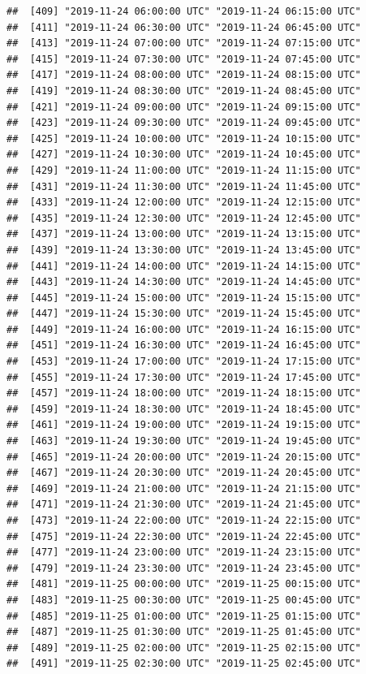 \documentclass{article}\usepackage[]{graphicx}\usepackage[]{color}
\makeatletter
\newenvironment{kframe}{%
 \def\at@end@of@kframe{}%
 \ifinner\ifhmode%
  \def\at@end@of@kframe{\end{minipage}}%
  \begin{minipage}{\columnwidth}%
 \fi\fi%
 \def\FrameCommand##1{\hskip\@totalleftmargin \hskip-\fboxsep
 \colorbox{shadecolor}{##1}\hskip-\fboxsep
     \hskip-\linewidth \hskip-\@totalleftmargin \hskip\columnwidth}%
 \MakeFramed {\advance\hsize-\width
   \@totalleftmargin\z@ \linewidth\hsize
   \@setminipage}}%
 {\par\unskip\endMakeFramed%
 \at@end@of@kframe}
\newenvironment{knitrout}{}{} %
\makeatother
\begin{document}
\begin{knitrout}
\begin{kframe}
\begin{verbatim}
##  [409] "2019-11-24 06:00:00 UTC" "2019-11-24 06:15:00 UTC"
##  [411] "2019-11-24 06:30:00 UTC" "2019-11-24 06:45:00 UTC"
##  [413] "2019-11-24 07:00:00 UTC" "2019-11-24 07:15:00 UTC"
##  [415] "2019-11-24 07:30:00 UTC" "2019-11-24 07:45:00 UTC"
##  [417] "2019-11-24 08:00:00 UTC" "2019-11-24 08:15:00 UTC"
##  [419] "2019-11-24 08:30:00 UTC" "2019-11-24 08:45:00 UTC"
##  [421] "2019-11-24 09:00:00 UTC" "2019-11-24 09:15:00 UTC"
##  [423] "2019-11-24 09:30:00 UTC" "2019-11-24 09:45:00 UTC"
##  [425] "2019-11-24 10:00:00 UTC" "2019-11-24 10:15:00 UTC"
##  [427] "2019-11-24 10:30:00 UTC" "2019-11-24 10:45:00 UTC"
##  [429] "2019-11-24 11:00:00 UTC" "2019-11-24 11:15:00 UTC"
##  [431] "2019-11-24 11:30:00 UTC" "2019-11-24 11:45:00 UTC"
##  [433] "2019-11-24 12:00:00 UTC" "2019-11-24 12:15:00 UTC"
##  [435] "2019-11-24 12:30:00 UTC" "2019-11-24 12:45:00 UTC"
##  [437] "2019-11-24 13:00:00 UTC" "2019-11-24 13:15:00 UTC"
##  [439] "2019-11-24 13:30:00 UTC" "2019-11-24 13:45:00 UTC"
##  [441] "2019-11-24 14:00:00 UTC" "2019-11-24 14:15:00 UTC"
##  [443] "2019-11-24 14:30:00 UTC" "2019-11-24 14:45:00 UTC"
##  [445] "2019-11-24 15:00:00 UTC" "2019-11-24 15:15:00 UTC"
##  [447] "2019-11-24 15:30:00 UTC" "2019-11-24 15:45:00 UTC"
##  [449] "2019-11-24 16:00:00 UTC" "2019-11-24 16:15:00 UTC"
##  [451] "2019-11-24 16:30:00 UTC" "2019-11-24 16:45:00 UTC"
##  [453] "2019-11-24 17:00:00 UTC" "2019-11-24 17:15:00 UTC"
##  [455] "2019-11-24 17:30:00 UTC" "2019-11-24 17:45:00 UTC"
##  [457] "2019-11-24 18:00:00 UTC" "2019-11-24 18:15:00 UTC"
##  [459] "2019-11-24 18:30:00 UTC" "2019-11-24 18:45:00 UTC"
##  [461] "2019-11-24 19:00:00 UTC" "2019-11-24 19:15:00 UTC"
##  [463] "2019-11-24 19:30:00 UTC" "2019-11-24 19:45:00 UTC"
##  [465] "2019-11-24 20:00:00 UTC" "2019-11-24 20:15:00 UTC"
##  [467] "2019-11-24 20:30:00 UTC" "2019-11-24 20:45:00 UTC"
##  [469] "2019-11-24 21:00:00 UTC" "2019-11-24 21:15:00 UTC"
##  [471] "2019-11-24 21:30:00 UTC" "2019-11-24 21:45:00 UTC"
##  [473] "2019-11-24 22:00:00 UTC" "2019-11-24 22:15:00 UTC"
##  [475] "2019-11-24 22:30:00 UTC" "2019-11-24 22:45:00 UTC"
##  [477] "2019-11-24 23:00:00 UTC" "2019-11-24 23:15:00 UTC"
##  [479] "2019-11-24 23:30:00 UTC" "2019-11-24 23:45:00 UTC"
##  [481] "2019-11-25 00:00:00 UTC" "2019-11-25 00:15:00 UTC"
##  [483] "2019-11-25 00:30:00 UTC" "2019-11-25 00:45:00 UTC"
##  [485] "2019-11-25 01:00:00 UTC" "2019-11-25 01:15:00 UTC"
##  [487] "2019-11-25 01:30:00 UTC" "2019-11-25 01:45:00 UTC"
##  [489] "2019-11-25 02:00:00 UTC" "2019-11-25 02:15:00 UTC"
##  [491] "2019-11-25 02:30:00 UTC" "2019-11-25 02:45:00 UTC"

\end{verbatim}
\end{kframe}
\end{knitrout}
\end{document}
